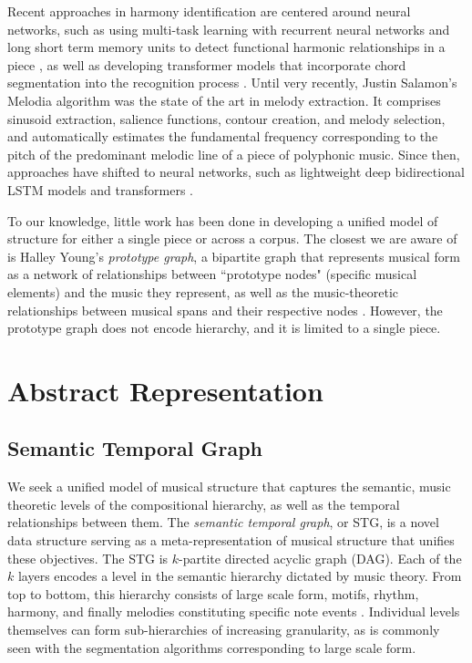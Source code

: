 \documentclass{article}
\begin{document}
Recent approaches in harmony identification are centered around neural networks, such as using multi-task
learning with recurrent neural networks and long short term memory units to detect functional harmonic relationships in a piece \cite{chen_2018_harmony}, as well as developing transformer models that incorporate chord segmentation into the recognition process \cite{chen_2019_harmony}. Until very recently, Justin Salamon's Melodia algorithm was the state of the art in melody extraction. It comprises sinusoid extraction, salience functions, contour creation, and melody selection, and automatically estimates the fundamental frequency corresponding to the pitch of the predominant melodic line of a piece of polyphonic music. Since then, approaches have shifted to neural networks, such as lightweight deep bidirectional
LSTM models \cite{kosta_22_melody} and transformers \cite{midibert}.

To our knowledge, little work has been done in developing a unified model of structure for either a single piece or across a corpus. The closest we are aware of is Halley Young's \textit{prototype graph}, a bipartite graph that represents musical form as a network of relationships between ``prototype nodes" (specific musical elements) and the music they represent, as well as the music-theoretic relationships between musical spans and their respective nodes \cite{young_2022}. However, the prototype graph does not encode hierarchy, and it is limited to a single piece.


\section{Abstract Representation}\label{sec:representation}


\subsection{Semantic Temporal Graph} \label{subsec:st_graph}
We seek a unified model of musical structure that captures the semantic, music theoretic levels of the compositional hierarchy, as well as the temporal relationships between them. The \textit{semantic temporal graph}, or STG, is a novel data structure serving as a meta-representation of musical structure that unifies these objectives. The STG is $k$-partite directed acyclic graph (DAG). Each of the $k$ layers encodes a level in the semantic hierarchy dictated by music theory. From top to bottom, this hierarchy consists of large scale form, motifs, rhythm, harmony, and finally melodies constituting specific note events \cite{msaf}. Individual levels themselves can form sub-hierarchies of increasing granularity, as is commonly seen with the segmentation algorithms corresponding to large scale form.
\end{document}
